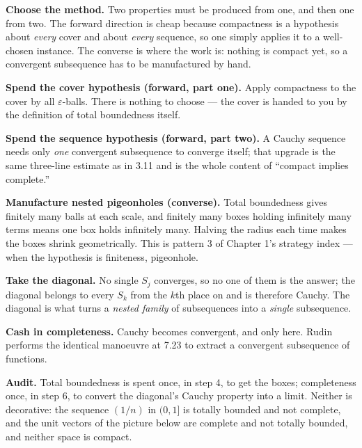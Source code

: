 \begin{proofwalk}
  \item \textbf{Choose the method.} Two properties must be produced from
        one, and then one from two. The forward direction is cheap because
        compactness is a hypothesis about \emph{every} cover and about
        \emph{every} sequence, so one simply applies it to a well-chosen
        instance. The converse is where the work is: nothing is compact yet,
        so a convergent subsequence has to be manufactured by hand.
  \item \textbf{Spend the cover hypothesis (forward, part one).} Apply
        compactness to the cover by all $\varepsilon$-balls. There is
        nothing to choose --- the cover is handed to you by the definition
        of total boundedness itself.
  \item \textbf{Spend the sequence hypothesis (forward, part two).} A Cauchy
        sequence needs only \emph{one} convergent subsequence to converge
        itself; that upgrade is the same three-line estimate as in 3.11 and
        is the whole content of ``compact implies complete.''
  \item \textbf{Manufacture nested pigeonholes (converse).} Total
        boundedness gives finitely many balls at each scale, and finitely
        many boxes holding infinitely many terms means one box holds
        infinitely many. Halving the radius each time makes the boxes shrink
        geometrically. This is pattern 3 of Chapter 1's strategy index ---
        when the hypothesis is finiteness, pigeonhole.
  \item \textbf{Take the diagonal.} No single $S_j$ converges, so no one of
        them is the answer; the diagonal belongs to every $S_k$ from the
        $k$th place on and is therefore Cauchy. The diagonal is what turns a
        \emph{nested family} of subsequences into a \emph{single}
        subsequence.
  \item \textbf{Cash in completeness.} Cauchy becomes convergent, and only
        here. Rudin performs the identical manoeuvre at 7.23 to extract a
        convergent subsequence of functions.
  \item \textbf{Audit.} Total boundedness is spent once, in step 4, to get
        the boxes; completeness once, in step 6, to convert the diagonal's
        Cauchy property into a limit. Neither is decorative: the sequence
        $(1/n)$ in $(0,1]$ is totally bounded and not complete, and the unit
        vectors of the picture below are complete and not totally bounded,
        and neither space is compact.
\end{proofwalk}

